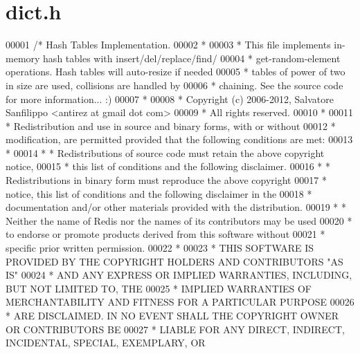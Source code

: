 \hypertarget{dict_8h_source}{}\section{dict.\+h}
\label{dict_8h_source}

\begin{DoxyCode}
00001 \textcolor{comment}{/* Hash Tables Implementation.}
00002 \textcolor{comment}{ *}
00003 \textcolor{comment}{ * This file implements in-memory hash tables with insert/del/replace/find/}
00004 \textcolor{comment}{ * get-random-element operations. Hash tables will auto-resize if needed}
00005 \textcolor{comment}{ * tables of power of two in size are used, collisions are handled by}
00006 \textcolor{comment}{ * chaining. See the source code for more information... :)}
00007 \textcolor{comment}{ *}
00008 \textcolor{comment}{ * Copyright (c) 2006-2012, Salvatore Sanfilippo <antirez at gmail dot com>}
00009 \textcolor{comment}{ * All rights reserved.}
00010 \textcolor{comment}{ *}
00011 \textcolor{comment}{ * Redistribution and use in source and binary forms, with or without}
00012 \textcolor{comment}{ * modification, are permitted provided that the following conditions are met:}
00013 \textcolor{comment}{ *}
00014 \textcolor{comment}{ *   * Redistributions of source code must retain the above copyright notice,}
00015 \textcolor{comment}{ *     this list of conditions and the following disclaimer.}
00016 \textcolor{comment}{ *   * Redistributions in binary form must reproduce the above copyright}
00017 \textcolor{comment}{ *     notice, this list of conditions and the following disclaimer in the}
00018 \textcolor{comment}{ *     documentation and/or other materials provided with the distribution.}
00019 \textcolor{comment}{ *   * Neither the name of Redis nor the names of its contributors may be used}
00020 \textcolor{comment}{ *     to endorse or promote products derived from this software without}
00021 \textcolor{comment}{ *     specific prior written permission.}
00022 \textcolor{comment}{ *}
00023 \textcolor{comment}{ * THIS SOFTWARE IS PROVIDED BY THE COPYRIGHT HOLDERS AND CONTRIBUTORS "AS IS"}
00024 \textcolor{comment}{ * AND ANY EXPRESS OR IMPLIED WARRANTIES, INCLUDING, BUT NOT LIMITED TO, THE}
00025 \textcolor{comment}{ * IMPLIED WARRANTIES OF MERCHANTABILITY AND FITNESS FOR A PARTICULAR PURPOSE}
00026 \textcolor{comment}{ * ARE DISCLAIMED. IN NO EVENT SHALL THE COPYRIGHT OWNER OR CONTRIBUTORS BE}
00027 \textcolor{comment}{ * LIABLE FOR ANY DIRECT, INDIRECT, INCIDENTAL, SPECIAL, EXEMPLARY, OR}

\end{DoxyCode}
